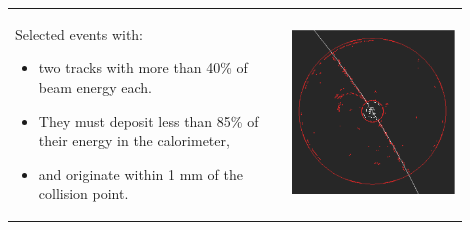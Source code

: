 \begin{slide*}
\slideframe{}
\begin{minipage}[t]{\linewidth}
\Large

\vspace{0.1 cm}

\begin{center}
  \begin{tabular}{p{0.55\linewidth} p{0.35\linewidth}}
    \begin{minipage}{\linewidth}
      Selected events with:
      \begin{itemize}

	\item two tracks with more than 40\% of beam energy each.

	\item They must deposit less than 85\% of their energy in the
	calorimeter,

        \item and originate within 1 mm of the collision point.

      \end{itemize}
    \end{minipage} &
    \begin{minipage}{\linewidth}
      \includegraphics[width=\linewidth]{mupair.eps}
    \end{minipage}
  \end{tabular}
\end{center}


\end{minipage}
\end{slide*}
